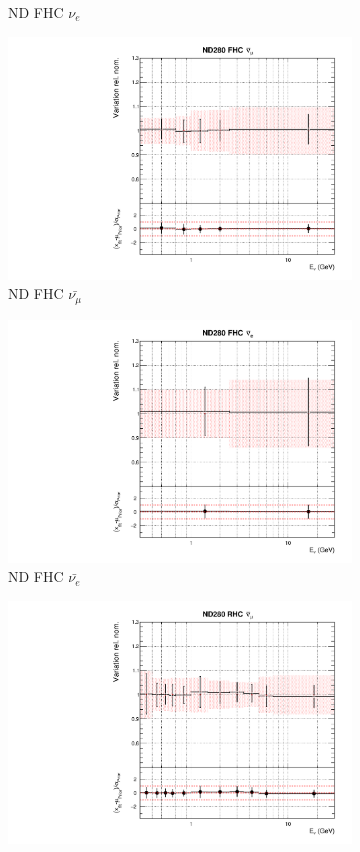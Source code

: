 \begin{figure}
\begin{subfigure}{0.24\textwidth}
  \caption{ND FHC $\nu_e$}
  \label{fig:}
\end{subfigure}
\begin{subfigure}{0.24\textwidth}
  \centering
  \includegraphics[width=0.95\linewidth]{figs/asmvflux2}
  \caption{ND FHC $\bar{\nu_{\mu}}$}
  \label{fig:}
\end{subfigure}
\begin{subfigure}{0.24\textwidth}
  \centering
  \includegraphics[width=0.95\linewidth]{figs/asmvflux3}
  \caption{ND FHC $\bar{\nu_{e}}$}
  \label{fig:}
\end{subfigure}
\begin{subfigure}{0.24\textwidth}
  \centering
  \includegraphics[width=0.95\linewidth]{figs/asmvflux4}

\end{subfigure}
\end{figure}
